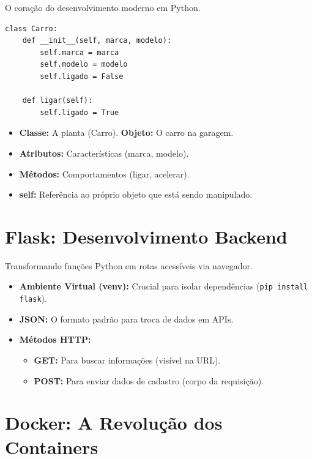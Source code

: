\documentclass[12pt,a4paper]{article}
\begin{document}
O coração do desenvolvimento moderno em Python.

\begin{boxCodigo}
\begin{verbatim}
class Carro:
    def __init__(self, marca, modelo):
        self.marca = marca
        self.modelo = modelo
        self.ligado = False

    def ligar(self):
        self.ligado = True
\end{verbatim}
\end{boxCodigo}

\begin{itemize}
    \item \textbf{Classe:} A planta (Carro). \textbf{Objeto:} O carro na garagem.
    \item \textbf{Atributos:} Características (marca, modelo).
    \item \textbf{Métodos:} Comportamentos (ligar, acelerar).
    \item \textbf{self:} Referência ao próprio objeto que está sendo manipulado.
\end{itemize}

\section{Flask: Desenvolvimento Backend}

Transformando funções Python em rotas acessíveis via navegador.

\begin{itemize}
    \item \textbf{Ambiente Virtual (venv):} Crucial para isolar dependências (\texttt{pip install flask}).
    \item \textbf{JSON:} O formato padrão para troca de dados em APIs.
    \item \textbf{Métodos HTTP:}
        \begin{itemize}
            \item \textbf{GET:} Para buscar informações (visível na URL).
            \item \textbf{POST:} Para enviar dados de cadastro (corpo da requisição).
        \end{itemize}
\end{itemize}

\section{Docker: A Revolução dos Containers}
\end{document}
